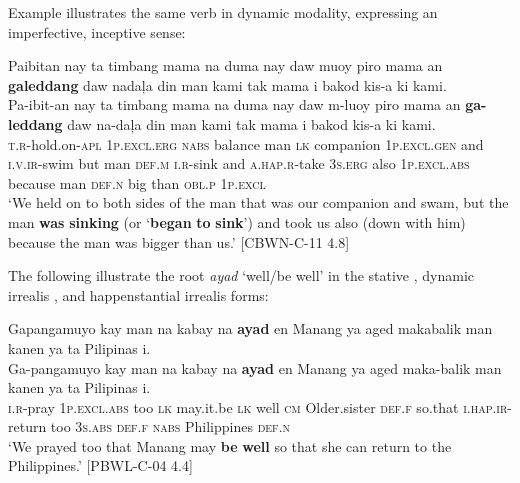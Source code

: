 Example  illustrates the same verb in dynamic modality, expressing an imperfective, inceptive sense:

\ea
\label{bkm:Ref388967386}
Paibitan  nay  ta  timbang  mama  na  duma  nay daw  muoy  piro  mama  an  \textbf{galeddang}  daw  nadaļa  din  man kami  tak  mama  i  bakod  kis-a  ki  kami.\\\smallskip
\gll Pa-ibit-an  nay  ta  timbang  mama  na  duma  nay daw  m-luoy  piro  mama  an  \textbf{ga-leddang}  daw  na-daļa  din  man kami  tak  mama  i  bakod  kis-a  ki  kami.\\
\textsc{t.r}-hold.on-\textsc{apl}  1\textsc{p.excl.erg}  \textsc{nabs}  balance  man  \textsc{lk}  companion  1\textsc{p.excl.gen} and  \textsc{i.v.ir}-swim  but  man  \textsc{def.m}  \textsc{i.r}-sink  and  \textsc{a.hap.r}-take  3\textsc{s.erg}  also  1\textsc{p.excl.abs}	because	man	\textsc{def.n}	big	than	\textsc{obl.p}	1\textsc{p.excl} \\
\glt ‘We held on to both sides of the man that was our companion and swam, but the man \textbf{was} \textbf{sinking} (or ‘\textbf{began} \textbf{to} \textbf{sink}’) and took us also (down with him) because the man was bigger than us.' [CBWN-C-11 4.8]
\z

The following illustrate the root \textit{ayad} ‘well/be well’ in the stative , dynamic irrealis , and happenstantial irrealis  forms: 

\ea
\label{bkm:Ref148778216}
Gapangamuyo  kay  man  na  kabay  na  \textbf{ayad}  en  Manang  ya aged  makabalik  man  kanen  ya  ta  Pilipinas  i.\\\smallskip
\gll Ga-pangamuyo  kay  man  na  kabay  na  \textbf{ayad}  en  Manang  ya aged  maka-balik  man  kanen  ya  ta  Pilipinas  i.\\
\textsc{i.r}-pray  1\textsc{p.excl.abs} too \textsc{lk}  may.it.be  \textsc{lk}   well  \textsc{cm}  Older.sister  \textsc{def.f} so.that  \textsc{i.hap.ir}-return  too  3\textsc{s.abs}  \textsc{def.f}  \textsc{nabs}  Philippines \textsc{def.n} \\
\glt ‘We prayed too that Manang may \textbf{be} \textbf{well} so that she can return to the Philippines.’ [PBWL-C-04 4.4]
\z

